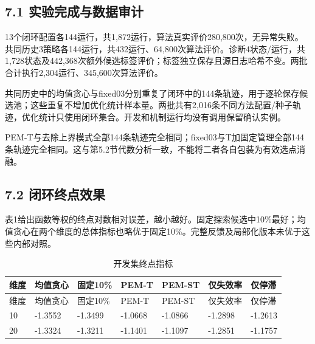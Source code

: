 \documentclass[11pt,a4paper]{article}
\begin{document}
\hypertarget{ux5b9eux9a8cux5b8cux6210ux4e0eux6570ux636eux5ba1ux8ba1}{%
\subsection{7.1
实验完成与数据审计}\label{ux5b9eux9a8cux5b8cux6210ux4e0eux6570ux636eux5ba1ux8ba1}}

13个闭环配置各144运行，共1,872运行，算法真实评价280,800次，无异常失败。共同历史3策略各144运行，共432运行、64,800次算法评价。诊断4状态/运行，共1,728状态及442,368次额外候选标签评价；标签独立保存且源日志哈希不变。两批合计执行2,304运行、345,600次算法评价。

共同历史中的均值贪心与fixed03分别重复了闭环中的144条轨迹，用于逐轮保存候选池；这些重复不增加优化统计样本量。两批共有2,016条不同方法配置/种子轨迹，优化统计只使用闭环集合。开发和机制运行均没有调用保留确认实例。

PEM-T与去除上界模式全部144条轨迹完全相同；fixed03与T加固定管理全部144条轨迹完全相同。这与第5.2节代数分析一致，不能将二者各自包装为有效选点消融。

\hypertarget{ux95edux73afux7ec8ux70b9ux6548ux679c}{%
\subsection{7.2
闭环终点效果}\label{ux95edux73afux7ec8ux70b9ux6548ux679c}}

表1给出函数等权的终点对数相对误差，越小越好。固定探索候选中10\%最好；均值贪心在两个维度的总体指标也略优于固定10\%。完整反馈及局部化版本未优于这些内部对照。

\par\noindent\begin{minipage}{\linewidth}

\begin{longtable}[]{@{}lllllll@{}}
\caption{开发集终点指标}\tabularnewline
\toprule
维度 & 均值贪心 & 固定10\% & PEM-T & PEM-ST & 仅失效率 & 仅停滞 \\
\midrule
\endfirsthead
\toprule
维度 & 均值贪心 & 固定10\% & PEM-T & PEM-ST & 仅失效率 & 仅停滞 \\
\midrule
\endhead
10 & -1.3552 & -1.3499 & -1.0668 & -1.0866 & -1.2898 & -1.2613 \\
20 & -1.3324 & -1.3211 & -1.1401 & -1.1097 & -1.2851 & -1.1757 \\
\bottomrule
\end{longtable}

\end{minipage}\par
\end{document}

